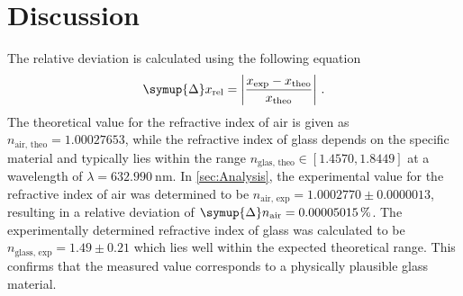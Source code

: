 \section{Discussion}
\label{sec:Discussion}
The relative deviation is calculated using the following equation
\begin{equation*}
    \symup{\Delta} x_{\text{rel}} = \left| \frac{x_{\text{exp}} - x_{{\text{theo}}}}{x_{{\text{theo}}}}\right|\,.
\end{equation*}
The theoretical value for the refractive index of air is given as $n_{\text{air, theo}}=1.00027653$, while the refractive index of glass depends on the specific material and typically lies within the range $n_{\text{glas, theo}}\in [1.4570, 1.8449]$ at a wavelength of $\lambda = \SI{632.990}{\nano\meter}$. 
In \autoref{sec:Analysis}, the experimental value for the refractive index of air was determined to be $n_{\text{air, exp}} = 1.0002770\pm0.0000013$, resulting in a relative deviation of $\symup{\Delta}n_{\text{air}} = 0.00005015\,\%$. 
The experimentally determined refractive index of glass was calculated to be $n_{\text{glass, exp}} = 1.49\pm0.21$ which lies well within the expected theoretical range. This confirms that the measured value corresponds to a physically plausible glass material.